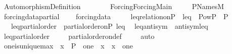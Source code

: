 %
\begin{isabellebody}%
%
%
\isadelimtheory
%
\endisadelimtheory
%
\isatagtheory
{}\isamarkupfalse%
\ Automorphism{\isacharunderscore}{\kern0pt}Definition\isanewline
\ \ \ \isanewline
\ \ \ \ {\isachardoublequoteopen}Forcing{\isacharslash}{\kern0pt}Forcing{\isacharunderscore}{\kern0pt}Main{\isachardoublequoteclose}\ \isanewline
\ \ \ \ P{\isacharunderscore}{\kern0pt}Names{\isacharunderscore}{\kern0pt}M\isanewline
{}%
\endisatagtheory
{\isafoldtheory}%
%
\isadelimtheory
\ \isanewline
%
\endisadelimtheory
\isanewline
{}\isamarkupfalse%
\ forcing{\isacharunderscore}{\kern0pt}data{\isacharunderscore}{\kern0pt}partial\ {\isacharequal}{\kern0pt}\ \isanewline
\ \ forcing{\isacharunderscore}{\kern0pt}data\ {\isacharplus}{\kern0pt}\ \isanewline
\ \ \ leq{\isacharunderscore}{\kern0pt}relation{\isacharunderscore}{\kern0pt}on{\isacharunderscore}{\kern0pt}P\ {\isacharcolon}{\kern0pt}\ {\isachardoublequoteopen}leq\ {\isasymin}\ Pow{\isacharparenleft}{\kern0pt}P\ {\isasymtimes}\ P{\isacharparenright}{\kern0pt}{\isachardoublequoteclose}\ \isanewline
\ \ \ leq{\isacharunderscore}{\kern0pt}partial{\isacharunderscore}{\kern0pt}order\ {\isacharcolon}{\kern0pt}\ {\isachardoublequoteopen}partial{\isacharunderscore}{\kern0pt}order{\isacharunderscore}{\kern0pt}on{\isacharparenleft}{\kern0pt}P{\isacharcomma}{\kern0pt}\ leq{\isacharparenright}{\kern0pt}{\isachardoublequoteclose}\ \isanewline
{}\isanewline
\isanewline
{}\isamarkupfalse%
\ leq{\isacharunderscore}{\kern0pt}antisym\ {\isacharcolon}{\kern0pt}\ {\isachardoublequoteopen}antisym{\isacharparenleft}{\kern0pt}leq{\isacharparenright}{\kern0pt}{\isachardoublequoteclose}\ \isanewline
%
\isadelimproof
\ \ %
\endisadelimproof
%
\isatagproof
{}\isamarkupfalse%
\ leq{\isacharunderscore}{\kern0pt}partial{\isacharunderscore}{\kern0pt}order\ \isanewline
\ \ \isamarkupfalse%
\ partial{\isacharunderscore}{\kern0pt}order{\isacharunderscore}{\kern0pt}on{\isacharunderscore}{\kern0pt}def\ \isanewline
\ \ \isamarkupfalse%
\ auto%
\endisatagproof
{\isafoldproof}%
%
\isadelimproof
\isanewline
%
\endisadelimproof
\isanewline
{}\isamarkupfalse%
\ one{\isacharunderscore}{\kern0pt}is{\isacharunderscore}{\kern0pt}unique{\isacharunderscore}{\kern0pt}max\ {\isacharcolon}{\kern0pt}\ {\isachardoublequoteopen}x\ {\isasymin}\ P\ {\isasymLongrightarrow}\ one\ {\isasympreceq}\ x\ {\isasymLongrightarrow}\ x\ {\isacharequal}{\kern0pt}\ one{\isachardoublequoteclose}\ \isanewline

\end{isabellebody}
